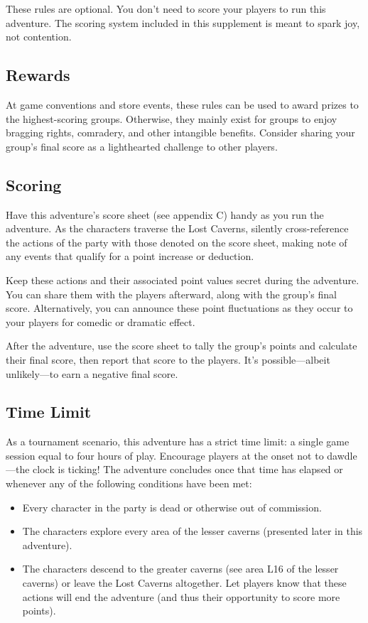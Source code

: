 \documentclass[10pt,a4paper,twoside,bg=print,twocolumn,openany,nodeprecatedcode]{dndbook}
\begin{document}
These rules are optional. You don't need to score your players to run this adventure. The scoring system included in this supplement is meant to spark joy, not contention.

\subsection{Rewards}
At game conventions and store events, these rules can be used to award prizes to the highest-scoring groups. Otherwise, they mainly exist for groups to enjoy bragging rights, comradery, and other intangible benefits. Consider sharing your group's final score as a lighthearted challenge to other players.

\subsection{Scoring}
Have this adventure's score sheet (see appendix C) handy as you run the adventure. As the characters traverse the Lost Caverns, silently cross-reference the actions of the party with those denoted on the score sheet, making note of any events that qualify for a point increase or deduction.

Keep these actions and their associated point values secret during the adventure. You can share them with the players afterward, along with the group's final score. Alternatively, you can announce these point fluctuations as they occur to your players for comedic or dramatic effect.

After the adventure, use the score sheet to tally the group's points and calculate their final score, then report that score to the players. It's possible—albeit unlikely—to earn a negative final score.

\subsection{Time Limit}
As a tournament scenario, this adventure has a strict time limit: a single game session equal to four hours of play. Encourage players at the onset not to dawdle—the clock is ticking! The adventure concludes once that time has elapsed or whenever any of the following conditions have been met:


\begin{itemize}
\item Every character in the party is dead or otherwise out of commission.
\item The characters explore every area of the lesser caverns (presented later in this adventure).
\item The characters descend to the greater caverns (see area L16 of the lesser caverns) or leave the Lost Caverns altogether. Let players know that these actions will end the adventure (and thus their opportunity to score more points).
\end{itemize}
\end{document}
